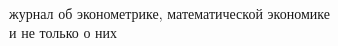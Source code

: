 \documentclass[12pt]{article}
\begin{document}

\pagestyle{empty}

\ \vfill

\centering 
\scalebox{40}{$\e_{\text{\scalebox{0.45}{\!1}}}$}

\vspace{15mm}


\vspace{15mm}


\vfill

журнал об эконометрике, математической экономике \\ и не только о них 

\end{document}
